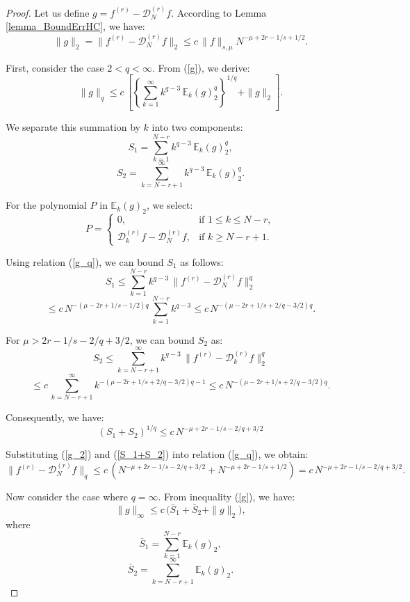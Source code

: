 \documentclass[10pt,a4paper]{amsart}
\begin{document}
\begin{proof}
Let us define $g=f^{(r)}-\mathcal{D}_N^{(r)}f$. According to Lemma \ref{lemma_BoundErrHC}, we have:
\begin{equation}   \label{g_2}
\|g\|_{2} = \|f^{(r)}-\mathcal{D}_N^{(r)} f\|_{2} \leq
c\, \|f\|_{s,\mu} N^{-\mu+2r-1/s+1/2} .
\end{equation}

First, consider the case $2<q< \infty$. From (\ref{g}), we derive:
\begin{equation}  \label{g_q}
\|g\|_{q} \le c\,
\left[ \left\{\sum_{k=1}^\infty  k^{q-3}\,\mathbb{E}_k(g)_{2}^{q} \right\}^{1/q} +
\|g\|_{2}\right] .
\end{equation}

We separate this summation by $k$ into two components:
$$
S_1 = \sum_{k=1}^{N-r}  k^{q-3}\,\mathbb{E}_k(g)_{2}^{q} ,
$$
$$
S_2 = \sum_{k=N-r+1}^{\infty}  k^{q-3}\,\mathbb{E}_k(g)_{2}^{q} .
$$

For the polynomial $P$ in $\mathbb{E}_k(g)_{2}$, we select:
\begin{equation}  \label{P_k}
P = \begin{cases}
0, & \text{if } 1\le k \le N-r ,\\
\mathcal{D}_k^{(r)} f - \mathcal{D}_N^{(r)} f, & \text{if } k\ge N-r+1 .
\end{cases}
\end{equation}

Using relation (\ref{g_q}), we can bound $S_1$ as follows:
$$
S_1 \le \sum_{k=1}^{N-r}  k^{q-3}\, \|f^{(r)}-\mathcal{D}_N^{(r)} f\|_{2}^q
$$
$$
\le c\, N^{-(\mu-2r+1/s-1/2)q}\, \sum_{k=1}^{N-r}  k^{q-3}
\le c\, N^{-(\mu-2r+1/s+2/q-3/2)q} .
$$

For $\mu>2r-1/s-2/q+3/2$, we can bound $S_2$ as:
$$
S_2 \le \sum_{k=N-r+1}^{\infty}  k^{q-3}\, \|f^{(r)}-\mathcal{D}_k^{(r)} f\|_{2}^q
$$
$$
\le c\, \sum_{k=N-r+1}^{\infty}  k^{-(\mu-2r+1/s+2/q-3/2)q-1}
\le c\, N^{-(\mu-2r+1/s+2/q-3/2)q} .
$$

Consequently, we have:
\begin{equation}   \label{S_1+S_2}
(S_1+S_2)^{1/q} \le c\, N^{-\mu+2r-1/s-2/q+3/2}
\end{equation}

Substituting (\ref{g_2}) and (\ref{S_1+S_2}) into relation (\ref{g_q}), we obtain:
$$
\|f^{(r)}-\mathcal{D}_N^{(r)} f\|_{q} \leq
c\, (N^{-\mu+2r-1/s-2/q+3/2} + N^{-\mu+2r-1/s+1/2})
= c\, N^{-\mu+2r-1/s-2/q+3/2} .
$$

Now consider the case where $q=\infty$. From inequality (\ref{g}), we have:
\begin{equation}  \label{g_infty}
\|g\|_{\infty} \le c\,
\Big(\bar{S}_1 + \bar{S}_2 + \|g\|_{2}\Big) ,
\end{equation}
where
$$
\bar{S}_1 = \sum_{k=1}^{N-r} \mathbb{E}_k(g)_{2} ,
$$
$$
\bar{S}_2 = \sum_{k=N-r+1}^{\infty} \mathbb{E}_k(g)_{2} .
$$


\end{proof}
\end{document}
